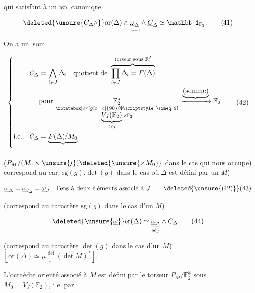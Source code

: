 qui satisfont à un iso. canonique

\[
\deleted{\unsure{C_\Delta\wedge}}\mathrm{or}(\Delta)\wedge\underset{\llcorner\mkern-2mu\rule{.85em}{.35pt}\mkern-2mu\lrcorner}{\underline\omega_\Delta}\wedge\underline C_\Delta
\simeq\mathbb 1_{\mathbb F_2}. \tag*{(41)}
\]

On a un isom.

\[
\left\{\begin{aligned}
 C_\Delta&=\bigwedge_{i\in J}\Delta_i\quad\text{quotient de }
 \overbrace{\prod_{i\in J}\Delta_i=F(\Delta)}^{\text{torseur sous }\mathbb F_2^J}\\
 &\text{pour }\underset{\substack{\rotatebox[origin=c]{90}{$\scriptstyle\simeq$}\\\underbrace{V_J(\mathbb F_2)}_{M_0}\times\mathbb F_2}}{\mathbb F_2^J}
 \xrightarrow{\underbrace{(\text{somme})}}\mathbb F_2\\
 \text{i.e.}\quad C_\Delta&=\underbrace{F(\Delta)/M_0}_{} 
\end{aligned}\right. \tag*{(42)}
\]

($P_M/(M_0\times\unsure{\mathfrak z})\deleted{\unsure{\times M_0}}$ dans le cas qui nous occupe) correspond au car. $\mathrm{sg}(g).\det(g)$ dans le cas  où $\Delta$ est défini par un $M$)

\reversemarginpar{}\normalmarginpar

\[
 \underline\omega_\Delta=\underline\omega_{I_\Delta}=\underline\omega_J
 \quad\text{l'ens à deux éléments associé à }J
 \tag*{\deleted{\unsure{(42)}}(43)}
\]

(correspond au caractère $\mathrm{sg}(g)$ dans le cas d'un $M$)

\[
 \deleted{\unsure{\underline\omega}}\mathrm{or}(\Delta)\simeq
 \underset{\underline\omega_J}{\underline{\underline\omega_\Delta}}\wedge C_\Delta \tag*{(44)}
\]

(correspond au caractère $\det(g)$ dans le cas d'un $M$)  $\left\lfloor\underline{\mathrm{or}(\Delta)\simeq\mu\overset{\mathrm{def}}{=}(\det M)^*}\right\rfloor$.

L'octaèdre \uline{orienté} \inserted{$\Delta^+$} associé à $M$ est défini par le torseur $P_M/\mathbb F_2^{\underline\omega}$ sous $M_0=V_J(\mathbb F_2)$, i.e. par
